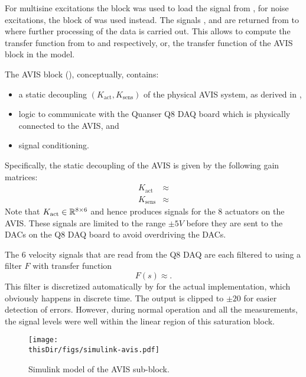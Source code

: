 
For multisine excitations the  block was used to load the  signal from \MATLAB, for noise excitations, the  block of \Simulink was used instead.
The signals ,  and  are returned from \Simulink to \MATLAB where further processing of the data is carried out.
This allows to compute the transfer function from  to  and  respectively, or, the transfer function of the \gls{AVIS} block in the \Simulink model.

The \gls{AVIS} block (), conceptually, contains:
\begin{itemize}
  \item a static decoupling $(K_{\mathrm{act}}, K_{\mathrm{sens}})$ of the physical \gls{AVIS} system, as derived in \citep{Rademakers2005MSc},
  \item logic to communicate with the Quanser Q8 \gls{DAQ} board which is physically connected to the \gls{AVIS}, and
  \item signal conditioning.
\end{itemize}

Specifically, the static decoupling of the \gls{AVIS} is given by the following gain matrices: 
\begin{align}
  K_{\mathrm{act}}    &\approx \\
  K_{\mathrm{sens}} &\approx
\end{align}
Note that $K_{\mathrm{act}} \in \mathbb{R}^{8\times6}$ and hence produces signals for the $8$ actuators on the \gls{AVIS}.
These signals are limited to the range $\pm 5\unit{V}$ before they are sent to the \glspl{DAC} on the Q8 \gls{DAQ} board to avoid overdriving the \glspl{DAC}.

The $6$ velocity signals that are read from the Q8 \gls{DAQ} are each filtered to  using a filter  $F$ with transfer function
\begin{equation}
  F(s) \approx 
  \text{.}
\end{equation}
This filter is discretized automatically by \Simulink for the actual implementation, which obviously happens in discrete time.
The output  is clipped to $\pm 20$ for easier detection of errors.
However, during normal operation and all the measurements, the signal levels were well within the linear region of this saturation block.

\begin{figure}
\setlength\figurewidth{\columnwidth}
  \texttt{[image: \\thisDir/figs/simulink-avis.pdf]}
  \caption{Simulink model of the AVIS sub-block.}
  \label{fig:avis:simulink:avis}
\end{figure}

